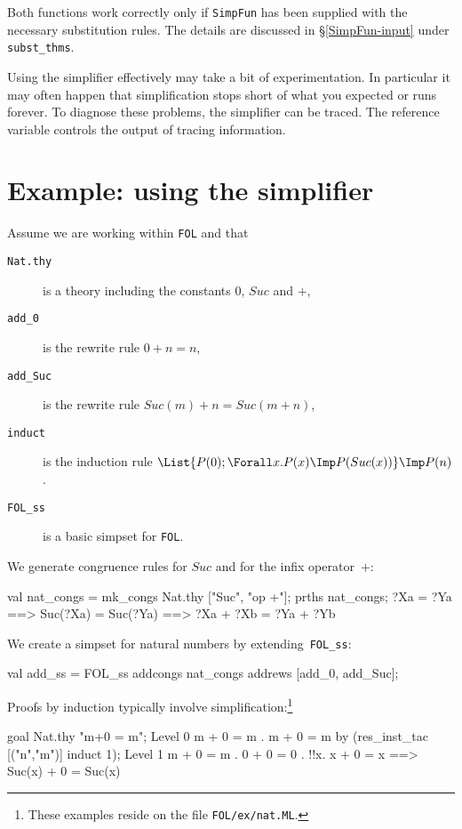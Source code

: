 Both functions work correctly only if {\tt SimpFun} has been supplied with the
necessary substitution rules.  The details are discussed in
\S\ref{SimpFun-input} under {\tt subst_thms}.
\begin{warn}
Using the simplifier effectively may take a bit of experimentation. In
particular it may often happen that simplification stops short of what you
expected or runs forever. To diagnose these problems, the simplifier can be
traced. The reference variable  controls the output of
tracing information.
\end{warn}


\section{Example: using the simplifier}
Assume we are working within {\tt FOL} and that
\begin{description}
\item[\tt Nat.thy] is a theory including the constants $0$, $Suc$ and $+$,
\item[\tt add_0] is the rewrite rule $0+n = n$,
\item[\tt add_Suc] is the rewrite rule $Suc(m)+n = Suc(m+n)$,
\item[\tt induct] is the induction rule
$\List{P(0); \Forall x. P(x)\Imp P(Suc(x))} \Imp P(n)$.
\item[\tt FOL_ss] is a basic simpset for {\tt FOL}.
\end{description}
We generate congruence rules for $Suc$ and for the infix operator~$+$:
\begin{ttbox}
val nat_congs = mk_congs Nat.thy ["Suc", "op +"];
prths nat_congs;
{\out ?Xa = ?Ya ==> Suc(?Xa) = Suc(?Ya)}
{\out [| ?Xa = ?Ya; ?Xb = ?Yb |] ==> ?Xa + ?Xb = ?Ya + ?Yb}
\end{ttbox}
We create a simpset for natural numbers by extending~{\tt FOL_ss}:
\begin{ttbox}
val add_ss = FOL_ss  addcongs nat_congs  
                     addrews  [add_0, add_Suc];
\end{ttbox}
Proofs by induction typically involve simplification:\footnote
{These examples reside on the file {\tt FOL/ex/nat.ML}.} 
\begin{ttbox}
goal Nat.thy "m+0 = m";
{\out Level 0}
{\out m + 0 = m}
{. m + 0 = m}
\ttbreak
by (res_inst_tac [("n","m")] induct 1);
{\out Level 1}
{\out m + 0 = m}
{. 0 + 0 = 0}
{. !!x. x + 0 = x ==> Suc(x) + 0 = Suc(x)}
\end{ttbox}
